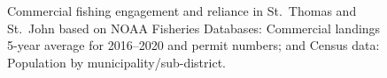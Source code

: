 \documentclass[
  letterpaper,
  oneside,
  open=any]{scrbook}
\begin{document}
\begin{figure}


\caption{\label{fig-PRreliance}Commercial fishing engagement and
reliance in St.~Thomas and St.~John based on NOAA Fisheries Databases:
Commercial landings 5-year average for 2016--2020 and permit numbers;
and Census data: Population by municipality/sub-district.}

\end{figure}%
\end{document}
